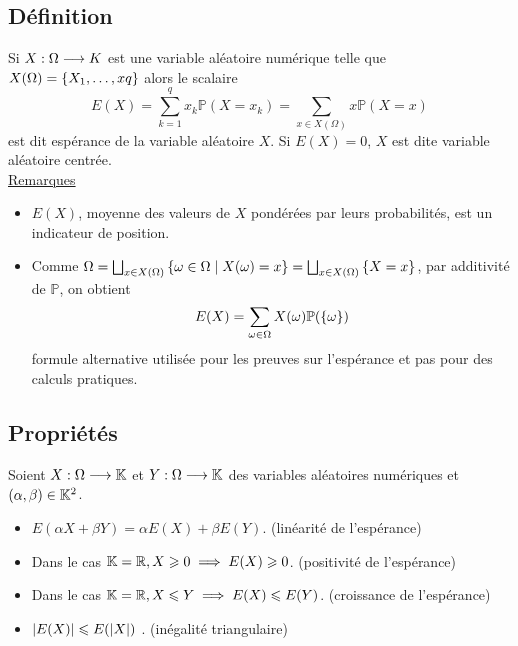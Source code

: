 \subsection{Définition}
\begin{defprop}
    Si \(X : \Omega \to \\K\) est une variable aléatoire numérique telle que \(X(\Omega) = \accol{X_1, \dots , xq}\) alors le scalaire
        \[E(X) = \sum^q_{k=1} x_k\mathbb{P}(X = x_k) = \sum_{x\in X(\Omega)}x\mathbb{P}(X = x)\]
    est dit espérance de la variable aléatoire \(X\). Si \(E(X) = 0\), \(X\) est dite variable aléatoire centrée.\\
    \underline{Remarques}\\
    \begin{itemize}
        \item \(E(X)\), moyenne des valeurs de \(X\) pondérées par leurs probabilités, est un indicateur de position.
        \item Comme \(\Omega = \bigsqcup _{x\in X(\Omega)} \accol{\omega \in  \Omega \tq X(\omega) = x} = \bigsqcup _{x\in X(\Omega)} \accol{X = x}\), par additivité de \(\mathbb{P}\), on obtient \[E(X) = \sum_{\omega\in \Omega} X(\omega)\mathbb{P} (\accol{\omega})\]
        formule alternative utilisée pour les preuves sur l’espérance et pas pour des calculs pratiques.
    \end{itemize}
\end{defprop}
\subsection{Propriétés}
\begin{prop}
    Soient \(X : \Omega \to \K\) et \(Y : \Omega \to \K\) des variables aléatoires numériques et \((\alpha , \beta ) \in  \K^2\).
    \begin{itemize}
        \item \(E(\alpha X + \beta Y ) = \alpha E(X) + \beta E(Y ).\) \hfill (linéarité de l’espérance)
        \item Dans le cas \(\K = \R, X \geq 0 \imp E(X) \geq 0\). \hfill (positivité de l’espérance)
        \item Dans le cas \(\K = \R, X \leq Y \imp E(X) \leq E(Y )\). \hfill(croissance de l’espérance)
        \item \(\abs{E (X)} \leq E (\abs{X})\) . \hfill (inégalité triangulaire)
    \end{itemize}
\end{prop}
